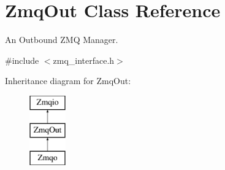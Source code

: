 \hypertarget{classZmqOut}{\section{Zmq\-Out Class Reference}
\label{classZmqOut}
}


An Outbound Z\-M\-Q Manager.  




{\ttfamily \#include $<$zmq\-\_\-interface.\-h$>$}

Inheritance diagram for Zmq\-Out\-:\begin{figure}[H]
\begin{center}
\leavevmode
\includegraphics[height=3.000000cm]{classZmqOut}
\end{center}
\end{figure}
